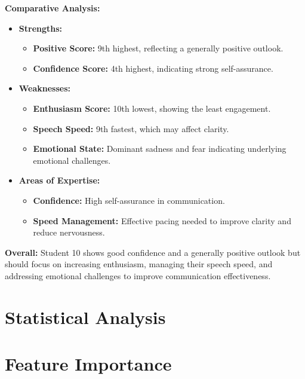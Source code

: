 \documentclass{article}
\begin{document}
\textbf{Comparative Analysis:}
\begin{itemize}
    \item \textbf{Strengths:}
    \begin{itemize}
        \item \textbf{Positive Score:} 9th highest, reflecting a generally positive outlook.
        \item \textbf{Confidence Score:} 4th highest, indicating strong self-assurance.
    \end{itemize}
    \item \textbf{Weaknesses:}
    \begin{itemize}
        \item \textbf{Enthusiasm Score:} 10th lowest, showing the least engagement.
        \item \textbf{Speech Speed:} 9th fastest, which may affect clarity.
        \item \textbf{Emotional State:} Dominant sadness and fear indicating underlying emotional challenges.
    \end{itemize}
    \item \textbf{Areas of Expertise:}
    \begin{itemize}
        \item \textbf{Confidence:} High self-assurance in communication.
        \item \textbf{Speed Management:} Effective pacing needed to improve clarity and reduce nervousness.
    \end{itemize}
\end{itemize}

\textbf{Overall:} Student 10 shows good confidence and a generally positive outlook but should focus on increasing enthusiasm, managing their speech speed, and addressing emotional challenges to improve communication effectiveness.





\section{Statistical Analysis}

\section{Feature Importance}
\end{document}
